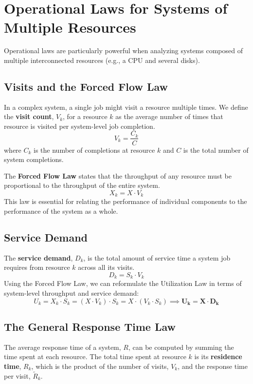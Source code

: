 \section{Operational Laws for Systems of Multiple Resources}

Operational laws are particularly powerful when analyzing systems composed of multiple interconnected resources (e.g., a CPU and several disks).

\subsection{Visits and the Forced Flow Law}
In a complex system, a single job might visit a resource multiple times. We define the \textbf{visit count}, $V_k$, for a resource $k$ as the average number of times that resource is visited per system-level job completion.
\begin{equation}
    V_k = \frac{C_k}{C}
\end{equation}
where $C_k$ is the number of completions at resource $k$ and $C$ is the total number of system completions.

The \textbf{Forced Flow Law} states that the throughput of any resource must be proportional to the throughput of the entire system.
\begin{equation}
    X_k = X \cdot V_k
\end{equation}
This law is essential for relating the performance of individual components to the performance of the system as a whole.

\subsection{Service Demand}
The \textbf{service demand}, $D_k$, is the total amount of service time a system job requires from resource $k$ across all its visits.
\begin{equation}
    D_k = S_k \cdot V_k
\end{equation}
Using the Forced Flow Law, we can reformulate the Utilization Law in terms of system-level throughput and service demand:
\begin{equation}
    U_k = X_k \cdot S_k = (X \cdot V_k) \cdot S_k = X \cdot (V_k \cdot S_k) \implies \boldsymbol{U_k = X \cdot D_k}
\end{equation}

\subsection{The General Response Time Law}
The average response time of a system, $R$, can be computed by summing the time spent at each resource. The total time spent at resource $k$ is its \textbf{residence time}, $R_k$, which is the product of the number of visits, $V_k$, and the response time per visit, $\tilde{R}_k$.

